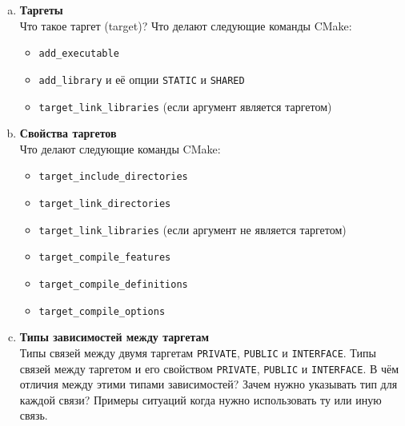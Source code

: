 \documentclass{article}
\begin{document}
\begin{enumerate}
\begin{enumerate}[a.]
\item \textbf{Таргеты}\\
Что такое таргет (target)? Что делают следующие команды CMake:
\begin{itemize}
\item \texttt{add\_executable}
\item \texttt{add\_library} и её опции \texttt{STATIC} и \texttt{SHARED}
\item \texttt{target\_link\_libraries} (если аргумент является таргетом)
\end{itemize}


\item \textbf{Свойства таргетов}\\
Что делают следующие команды CMake:
\begin{itemize}
\item \texttt{target\_include\_directories}
\item \texttt{target\_link\_directories}
\item \texttt{target\_link\_libraries} (если аргумент не является таргетом)
\item \texttt{target\_compile\_features}
\item \texttt{target\_compile\_definitions}
\item \texttt{target\_compile\_options}
\end{itemize}


\item \textbf{Типы зависимостей между таргетам}\\
Типы связей между двумя таргетам \texttt{PRIVATE}, \texttt{PUBLIC} и \texttt{INTERFACE}.
Типы связей между таргетом и его свойством \texttt{PRIVATE}, \texttt{PUBLIC} и \texttt{INTERFACE}.
В чём отличия между этими типами зависимостей? Зачем нужно указывать тип для каждой связи? 
Примеры ситуаций когда нужно использовать ту или иную связь.



\end{enumerate}
\end{enumerate}
\end{document}
